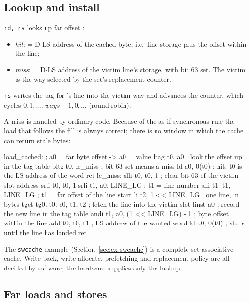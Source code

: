 \subsection{Lookup and install}
 \texttt{rd, rs} looks up far offset :
\begin{itemize}
\item \emph{hit}:  = D-LS address of the cached byte, i.e.\ line storage plus the offset within
  the line;
\item \emph{miss}:  = D-LS address of the victim line's storage, with bit 63 set. The victim is
  the way selected by the set's replacement counter.
\end{itemize}
 \texttt{rs} writes the tag for 's line into the victim way and advances the
counter, which cycles $0, 1, \ldots, \textit{ways}-1, 0, \ldots$ (round robin).

A miss is handled by ordinary code. Because of the as-if-synchronous rule the load that follows the
fill is always correct; there is no window in which the cache can return stale bytes:

\begin{asm}
load_cached:                            ; a0 = far byte offset -> a0 = value
        ltag  t0, a0                    ; look the offset up in the tag table
        bltz  t0, lc_miss               ; bit 63 set means a miss
        ld    a0, 0(t0)                 ; hit: t0 is the LS address of the word
        ret
lc_miss:
        slli  t0, t0, 1                 ; clear bit 63 of the victim slot address
        srli  t0, t0, 1
        srli  t1, a0, LINE_LG           ; t1 = line number
        slli  t1, t1, LINE_LG           ; t1 = far offset of the line start
        li    t2, 1 << LINE_LG          ; one line, in bytes
        tget  tg0, t0, c0, t1, t2       ; fetch the line into the victim slot
        linst a0                        ; record the new line in the tag table
        andi  t1, a0, (1 << LINE_LG) - 1 ; byte offset within the line
        add   t0, t0, t1                ; LS address of the wanted word
        ld    a0, 0(t0)                 ; stalls until the line has landed
        ret
\end{asm}

The \texttt{swcache} example (Section~\ref{sec:ex-swcache}) is a complete set-associative cache.
Write-back, write-allocate, prefetching and replacement policy are all decided by software; the
hardware supplies only the lookup.

\subsection{Far loads and stores}\label{sec:farls}

